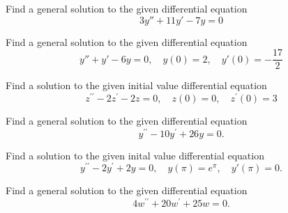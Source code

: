 \documentclass[11pt]{article}
\begin{document}
\makelabtitle




\begin{problem}
Find a general solution to the given differential equation
\begin{equation*}
3y'' + 11y' - 7 y =0
\end{equation*}
\end{problem}


\begin{problem}
Find a general solution to the given differential equation
\begin{equation*}
y'' +y' -6y =0, \quad y(0)=2, \quad y'(0)=-\frac{17}{2}
\end{equation*}
\end{problem}



\begin{problem}
Find a solution to the given initial value differential equation
\begin{equation*}
z^{\prime \prime} -2 z^{\prime} -2z=0, \quad z(0) =0, \quad z^{\prime}(0) = 3
\end{equation*}
\end{problem}



\begin{problem}
Find a general solution to the given differential equation
\begin{equation*}
y^{\prime \prime} -10 y^{\prime} +26 y =0.
\end{equation*}
\end{problem}


\begin{problem}
Find a solution to the given inital value differential equation
\begin{equation*}
y^{\prime \prime} -2 y^{\prime} +2 y =0, \quad y(\pi)=e^{\pi}, \quad y'(\pi)=0.
\end{equation*}
\end{problem}


\begin{problem}
Find a general solution to the given differential equation
\begin{equation*}
4 w^{\prime \prime} + 20 w^{\prime} +25 w =0.
\end{equation*}
\end{problem}
\end{document}
